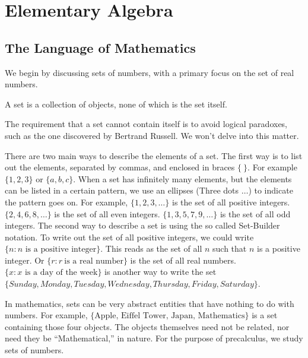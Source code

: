 \documentclass[crop=false,class=article,oneside]{standalone}
\begin{document}
    \ifx\ifmathcourseselementaryalgebra\undefined
        \section*{Elementary Algebra}
        \setcounter{section}{1}
    \fi
    \subsection{The Language of Mathematics}
        We begin by discussing sets of numbers,
        with a primary focus on the set of real numbers.
        \begin{definition}
            A set is a collection of objects,
            none of which is the set itself.
        \end{definition}
        \begin{remark}
            The requirement that a set cannot contain itself
            is to avoid logical paradoxes,
            such as the one discovered by Bertrand Russell.
            We won't delve into this matter.
        \end{remark}
        \begin{remark}
            There are two main ways to describe the elements of a set.
            The first way is to list out the elements, separated by commas,
            and enclosed in braces $\{\ \}$. For example $\{1,2,3\}$ or
            $\{a,b,c\}$. When a set has infinitely many elements, but the
            elements can be listed in a certain pattern, we use an ellipses
            (Three dots $\hdots$) to indicate the pattern goes on.
            For example, $\{1,2,3,\hdots\}$ is the set of all positive
            integers. $\{2,4,6,8,\hdots\}$ is the set of all even integers.
            $\{1,3,5,7,9,\hdots\}$ is the set of all odd integers. The second
            way to describe a set is using the so called Set-Builder notation.
            To write out the set of all positive integers, we could write
            $\{n:n\textrm{ is a positive integer}\}$.
            This reads as the set of all $n$ such that $n$ is a
            positive integer. Or $\{r: r\ \textrm{is a real number}\}$
            is the set of all real numbers.
            $\{x:x\textrm{ is a day of the week}\}$ is another way
            to write the set
            $\{Sunday,Monday,Tuesday,Wednesday,Thursday,Friday,Saturday\}$.
        \end{remark}
        \begin{remark}
            In mathematics, sets can be very abstract entities that
            have nothing to do with numbers. For example,
            $\{\textrm{Apple, Eiffel Tower, Japan, Mathematics}\}$
            is a set containing those four objects. The objects
            themselves need not be related, nor need they be
            ``Mathematical,'' in nature. For the purpose of
            precalculus, we study sets of numbers.
        \end{remark}
\end{document}
